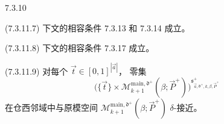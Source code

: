 \begin{proposition}{7.3.10}
\par\noindent\textup{(7.3.11.7)}\quad
下文的相容条件 7.3.13 和 7.3.14 成立。

\par\noindent\textup{(7.3.11.8)}\quad
下文的相容条件 7.3.17 成立。

\par\noindent\textup{(7.3.11.9)}\quad
对每个 $\vec t\in[0,1]^{|\vec a|}$，
零集
\[
\bigl(\{\vec t\}\times
\mathcal M^{\mathrm{main},\mathfrak d^+}_{k+1}
(\beta;\vec P^+)\bigr)
^{\mathfrak s^+_{\vec a,\mathfrak d^+,k,\beta,\vec P^+}}
\]
在仓西邻域中与原模空间
$\mathcal M^{\mathrm{main},\mathfrak d^+}_{k+1}
(\beta;\vec P^+)$ $\delta$-接近。
\end{proposition}
